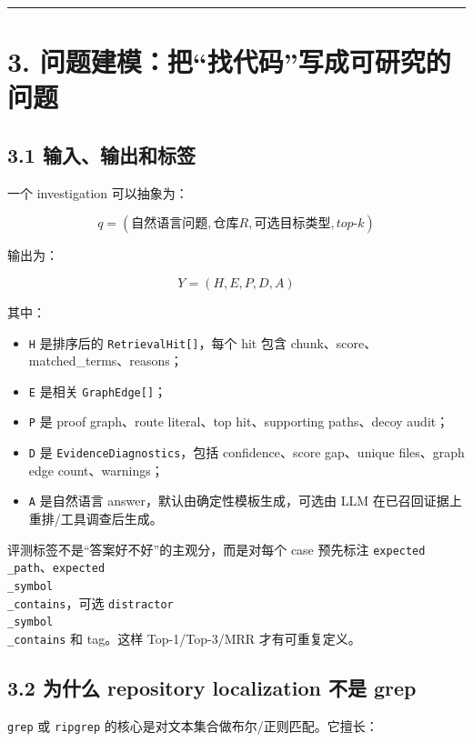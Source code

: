 \documentclass[UTF8,12pt,openany]{ctexbook}
\begin{document}
\hrule

\section{3. 问题建模：把“找代码”写成可研究的问题}

\subsection{3.1 输入、输出和标签}

一个 investigation 可以抽象为：\par

\[
q=(自然语言问题, 仓库 R, 可选目标类型, top\text{-}k)
\]

输出为：\par

\[
Y=(H, E, P, D, A)
\]

其中：\par

\begin{itemize}
\item \texttt{H} 是排序后的 \texttt{RetrievalHit[]}，每个 hit 包含 chunk、score、matched\_terms、reasons；
\item \texttt{E} 是相关 \texttt{GraphEdge[]}；
\item \texttt{P} 是 proof graph、route literal、top hit、supporting paths、decoy audit；
\item \texttt{D} 是 \texttt{EvidenceDiagnostics}，包括 confidence、score gap、unique files、graph edge count、warnings；
\item \texttt{A} 是自然语言 answer，默认由确定性模板生成，可选由 LLM 在已召回证据上重排/工具调查后生成。
\end{itemize}

评测标签不是“答案好不好”的主观分，而是对每个 case 预先标注 \texttt{expected\\_path}、\texttt{expected\\_symbol\\_contains}，可选 \texttt{distractor\\_symbol\\_contains} 和 tag。这样 Top-1/Top-3/MRR 才有可重复定义。\par

\subsection{3.2 为什么 repository localization 不是 grep}

\texttt{grep} 或 \texttt{ripgrep} 的核心是对文本集合做布尔/正则匹配。它擅长：\par
\end{document}
